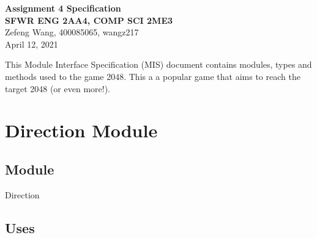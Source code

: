 \documentclass[12pt]{article}
\newcommand{\authornote}[3]{\textcolor{#1}{[#3 ---#2]}}
\newcommand{\authornote}[3]{}
\newcommand{\wss}[1]{\authornote{blue}{SS}{#1}}
\begin{document}
\begin{center}
\huge \textbf{Assignment 4 Specification}\\[4mm]
\large \textbf{SFWR ENG 2AA4, COMP SCI 2ME3}\\[2mm]
Zefeng Wang, 400085065, wangz217\\[2mm]
April 12, 2021
\end{center}

\newpage
This Module Interface Specification (MIS) document contains modules, types and
methods used to the game 2048. This a a popular game that aims to reach the target 2048 (or even more!).





% 
% 

\newpage

%

\section* {Direction Module}

\subsection*{Module}

Direction

\subsection* {Uses}
\end{document}
